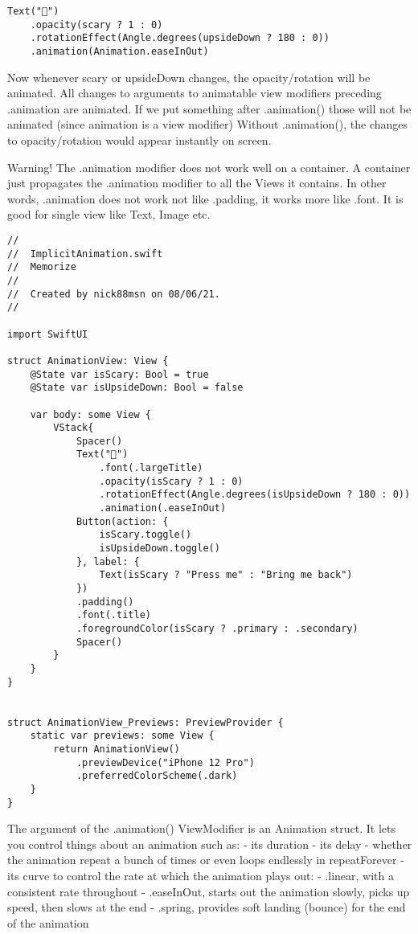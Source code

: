 \documentclass[]{article}
\begin{document}
\begin{verbatim}
Text("👻")
    .opacity(scary ? 1 : 0)
    .rotationEffect(Angle.degrees(upsideDown ? 180 : 0))
    .animation(Animation.easeInOut)
\end{verbatim}

Now whenever scary or upsideDown changes, the opacity/rotation will be
animated. All changes to arguments to animatable view modifiers
preceding .animation are animated. If we put something after
.animation() those will not be animated (since animation is a view
modifier) Without .animation(), the changes to opacity/rotation would
appear instantly on screen.

Warning! The .animation modifier does not work well on a container. A
container just propagates the .animation modifier to all the Views it
contains. In other words, .animation does not work not like .padding, it
works more like .font. It is good for single view like Text, Image etc.

\begin{verbatim}
//
//  ImplicitAnimation.swift
//  Memorize
//
//  Created by nick88msn on 08/06/21.
//

import SwiftUI

struct AnimationView: View {
    @State var isScary: Bool = true
    @State var isUpsideDown: Bool = false
    
    var body: some View {
        VStack{
            Spacer()
            Text("👻")
                .font(.largeTitle)
                .opacity(isScary ? 1 : 0)
                .rotationEffect(Angle.degrees(isUpsideDown ? 180 : 0))
                .animation(.easeInOut)
            Button(action: {
                isScary.toggle()
                isUpsideDown.toggle()
            }, label: {
                Text(isScary ? "Press me" : "Bring me back")
            })
            .padding()
            .font(.title)
            .foregroundColor(isScary ? .primary : .secondary)
            Spacer()
        }
    }
}


struct AnimationView_Previews: PreviewProvider {
    static var previews: some View {
        return AnimationView()
            .previewDevice("iPhone 12 Pro")
            .preferredColorScheme(.dark)
    }
}
\end{verbatim}

The argument of the .animation() ViewModifier is an Animation struct. It
lets you control things about an animation such as: - its duration - its
delay - whether the animation repeat a bunch of times or even loops
endlessly in repeatForever - its curve to control the rate at which the
animation plays out: - .linear, with a consistent rate throughout -
.easeInOut, starts out the animation slowly, picks up speed, then slows
at the end - .spring, provides soft landing (bounce) for the end of the
animation
\end{document}
